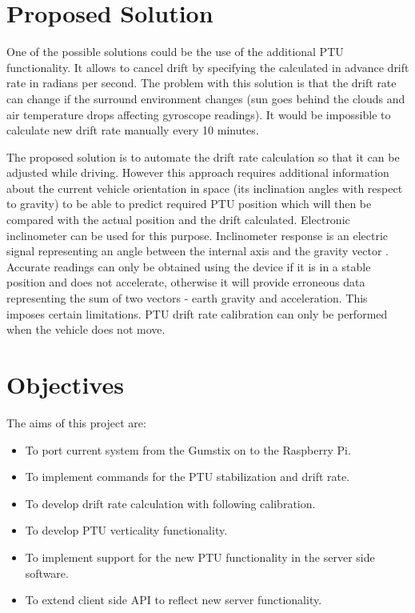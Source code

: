 \section{Proposed Solution}
One of the possible solutions could be the use of the additional PTU functionality. It allows to cancel drift by specifying the calculated in advance drift rate in radians per second. The problem with this solution is that the drift rate can change if the surround environment changes (sun goes behind the clouds and air temperature drops affecting gyroscope readings). It would be impossible to calculate new drift rate manually every 10 minutes.

The proposed solution is to automate the drift rate calculation so that it can be adjusted while driving. However this approach requires additional information about the current vehicle orientation in space (its inclination angles with respect to gravity) to be able to predict required PTU position which will then be compared with the actual position and the drift calculated. Electronic inclinometer can be used for this purpose. Inclinometer response is an electric signal representing an angle between the internal axis and the gravity vector \cite{HandbookOfModernSensors}. Accurate readings can only be obtained using the device if it is in a stable position and does not accelerate, otherwise it will provide erroneous data representing the sum of two vectors - earth gravity and acceleration. This imposes certain limitations. PTU drift rate calibration can only be performed when the vehicle does not move.

\section{Objectives}

The aims of this project are:
\begin{itemize}
\item To port current system from the Gumstix on to the Raspberry Pi.
\item To implement commands for the PTU stabilization and drift rate.
\item To develop drift rate calculation with following calibration.
\item To develop PTU verticality functionality.
\item To implement support for the new PTU functionality in the server side software.
\item To extend client side API to reflect new server functionality.
\end{itemize}

